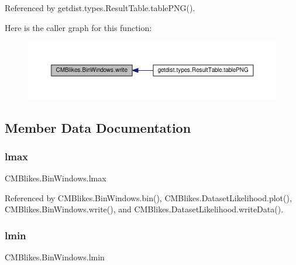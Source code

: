 Referenced by getdist.\+types.\+Result\+Table.\+table\+P\+N\+G().

Here is the caller graph for this function\+:
\nopagebreak
\begin{figure}[H]
\begin{center}
\leavevmode
\includegraphics[width=350pt]{classCMBlikes_1_1BinWindows_a447bc4a1d1f5e848e75a988a381ab81e_icgraph}
\end{center}
\end{figure}


\subsection{Member Data Documentation}
\mbox{\label{classCMBlikes_1_1BinWindows_a28addfcc4371a0b3c4c4ea2c2038161c}} 
\subsubsection{\texorpdfstring{lmax}{lmax}}
{\footnotesize\ttfamily C\+M\+Blikes.\+Bin\+Windows.\+lmax}



Referenced by C\+M\+Blikes.\+Bin\+Windows.\+bin(), C\+M\+Blikes.\+Dataset\+Likelihood.\+plot(), C\+M\+Blikes.\+Bin\+Windows.\+write(), and C\+M\+Blikes.\+Dataset\+Likelihood.\+write\+Data().

\mbox{\label{classCMBlikes_1_1BinWindows_a57ae8166b156cd6f33470d03d9ff02ae}} 
\subsubsection{\texorpdfstring{lmin}{lmin}}
{\footnotesize\ttfamily C\+M\+Blikes.\+Bin\+Windows.\+lmin}



